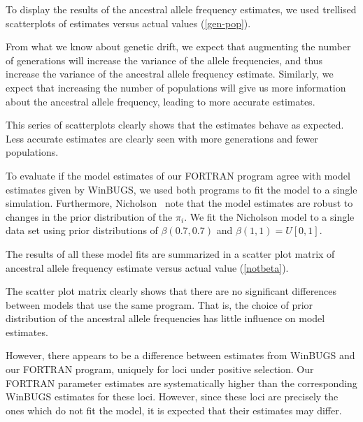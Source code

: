 \documentclass[a4paper,12pt]{article}
\begin{document}
To display the results of the ancestral allele frequency estimates, we
used trellised scatterplots of estimates versus actual values
(\autoref{gen-pop}).


From what we know about genetic drift, we expect that augmenting the
number of generations will increase the variance of the allele
frequencies, and thus increase the variance of the ancestral allele
frequency estimate. Similarly, we expect that increasing the number of
populations will give us more information about the ancestral allele
frequency, leading to more accurate estimates.

This series of scatterplots clearly shows that the estimates behave as
expected. Less accurate estimates are clearly seen with more
generations and fewer populations.

To evaluate if the model estimates of our FORTRAN program agree with
model estimates given by WinBUGS, we used both programs to fit the
model to a single simulation. Furthermore, Nicholson \etal\ note that
the model estimates are robust to changes in the prior distribution of
the $\pi_i$. We fit the Nicholson model to a single data set using
prior distributions of $\beta(0.7,0.7)$ and $\beta(1,1)=U[0,1]$.

The results of all these model fits are summarized in a scatter plot
matrix of ancestral allele frequency estimate versus actual value
(\autoref{notbeta}).


The scatter plot matrix clearly shows that there are no significant
differences between models that use the same program. That is, the
choice of prior distribution of the ancestral allele frequencies has
little influence on model estimates.

However, there appears to be a difference between estimates from
WinBUGS and our FORTRAN program, uniquely for loci under positive
selection. Our FORTRAN parameter estimates are systematically higher
than the corresponding WinBUGS estimates for these loci. However,
since these loci are precisely the ones which do not fit the model, it
is expected that their estimates may differ.
\end{document}
